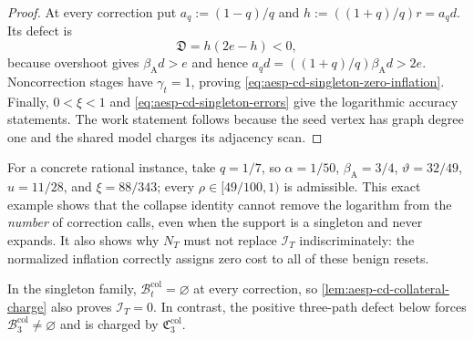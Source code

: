 \begin{proof}
At every correction put $a_q:=(1-q)/q$ and
$h:=((1+q)/q)r=a_qd$.  Its defect is
\begin{equation*}
 \mathfrak D=h(2e-h)<0,
\end{equation*}
because overshoot gives $\beta_{\mathrm A}d>e$ and hence
$a_qd=((1+q)/q)\beta_{\mathrm A}d>2e$.  Noncorrection stages have
$\gamma_t=1$, proving \cref{eq:aesp-cd-singleton-zero-inflation}.  Finally,
$0<\xi<1$ and \cref{eq:aesp-cd-singleton-errors} give the logarithmic
accuracy statements.  The work statement follows because the seed vertex
has graph degree one and the shared model charges its adjacency scan.
\end{proof}

For a concrete rational instance, take $q=1/7$, so
$\alpha=1/50$, $\beta_{\mathrm A}=3/4$,
$\vartheta=32/49$, $u=11/28$, and $\xi=88/343$; every
$\rho\in[49/100,1)$ is admissible.  This exact example shows that the
collapse identity cannot remove the logarithm from the \emph{number} of
correction calls, even when the support is a singleton and never expands.
It also shows why $N_T$ must not replace $\mathcal I_T$ indiscriminately:
the normalized inflation correctly assigns zero cost to all of these
benign resets.

In the singleton family,
$\mathcal B_t^{\mathrm{col}}=\varnothing$ at every correction, so
\cref{lem:aesp-cd-collateral-charge} also proves
$\mathcal I_T=0$.  In contrast, the positive three-path defect below forces
$\mathcal B_3^{\mathrm{col}}\neq\varnothing$ and is charged by
$\mathfrak C_3^{\mathrm{col}}$.

